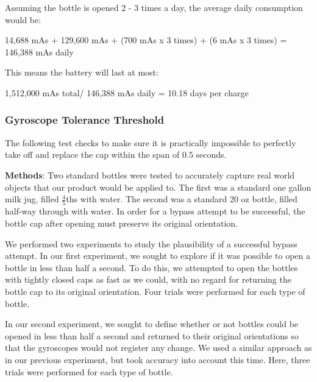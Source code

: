 \documentclass[12pt]{article}
\begin{document}
		Assuming the bottle is opened 2 - 3 times a day, the average daily consumption would be:
		\begin{center}
			14,688 mAs + 129,600 mAs +  (700 mAs x 3 times) + (6 mAs x 3 times) = 146,388 mAs daily
		\end{center}
		
		This means the battery will last at most:
		\begin{center}
			1,512,000 mAs total/ 146,388  mAs daily = 10.18 days per charge
		\end{center}
		
		\subsubsection*{Gyroscope Tolerance Threshold}
		The following test checks to make sure it is practically impossible to perfectly take off and replace the cap within the span of 0.5 seconds.
		
		\textbf{Methods}: Two standard bottles were tested to accurately capture real world objects that our product would be applied to. The first was a standard one gallon milk jug, filled $\frac{4}{5}$ths with water. The second was a standard 20 oz bottle, filled half-way through with water. In order for a bypass attempt to be successful, the bottle cap after opening must preserve its original orientation. 
		
		We performed two experiments to study the plausibility of a successful bypass attempt. In our first experiment, we sought to explore if it was possible to open a bottle in less than half a second. To do this, we attempted to open the bottles with tightly closed caps as fast as we could, with no regard for returning the bottle cap to its original orientation. Four trials were performed for each type of bottle. 
		
		In our second experiment, we sought to define whether or not bottles could be opened in less than half a second and returned to their original orientations so that the gyroscopes would not register any change. We used a similar approach as in our previous experiment, but took accuracy into account this time. Here, three trials were performed for each type of bottle. 
		
\end{document}

